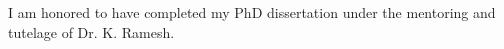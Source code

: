 \begin{acknowledge}

I am honored to have completed my PhD dissertation under the mentoring and tutelage of Dr. K. Ramesh.

\end{acknowledge}